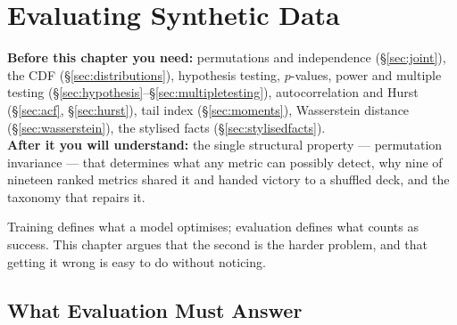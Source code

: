 \chapter{Evaluating Synthetic Data}
\label{ch:evaluation}

\begin{tcolorbox}[feynbox={Sky}{BBg},title={Before and After}]
\textbf{Before this chapter you need:} permutations and independence
(\S\ref{sec:joint}), the CDF (\S\ref{sec:distributions}), hypothesis testing,
$p$-values, power and multiple testing
(\S\ref{sec:hypothesis}--\S\ref{sec:multipletesting}), autocorrelation and Hurst
(\S\ref{sec:acf}, \S\ref{sec:hurst}), tail index (\S\ref{sec:moments}),
Wasserstein distance (\S\ref{sec:wasserstein}), the stylised facts
(\S\ref{sec:stylisedfacts}).\\
\textbf{After it you will understand:} the single structural property ---
permutation invariance --- that determines what any metric can possibly detect,
why nine of nineteen ranked metrics shared it and handed victory to a shuffled
deck, and the taxonomy that repairs it.
\end{tcolorbox}

Training defines what a model optimises; evaluation defines what counts as
success. This chapter argues that the second is the harder problem, and that
getting it wrong is easy to do without noticing.

\section{What Evaluation Must Answer}
\label{sec:evalquestions}



